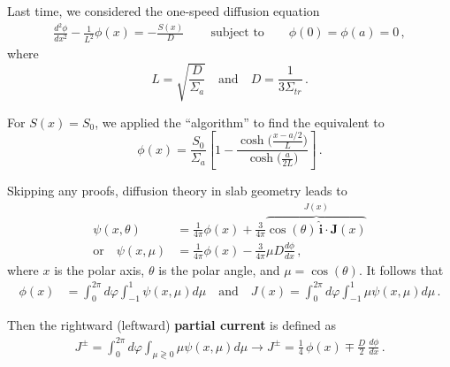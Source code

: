 \documentclass[compact]{ne630handout}
\begin{document}
\begin{handoutflow}


Last time, we considered the one-speed diffusion equation
\begin{align*}
   \frac{d^2 \phi}{d x^2}
  - \frac{1}{L^2}\phi(x)
  = -\frac{S(x)}{D} \, \qquad \text{subject to} \qquad \phi(0) = \phi(a) = 0 \, ,
\end{align*}
where
\begin{equation*}
 L = \sqrt{\frac{D}{\Sigma_a}} \quad \text{and} \quad D = \frac{1}{3\Sigma_{tr}} \, .
\end{equation*}

For $S(x) = S_0$, we applied the ``algorithm''  to find the equivalent to
\begin{equation*}
 \phi(x)=\frac{S_0}{\Sigma_a}\left[1-\frac{\cosh\!\big(\tfrac{x-a/2}{L}\big)}{\cosh\!\big(\tfrac{a}{2L}\big)}\right] \, .
 \label{eq:ex1sol}
\end{equation*}

Skipping any proofs, diffusion theory in slab geometry leads to
\begin{align*}
  \psi(x, \theta)  &= \frac{1}{4\pi} {\phi}(x) + \frac{3}{4\pi} \overbrace{\cos(\theta) \, \hat{\mathbf{i}} \cdot \mathbf{J}(x)}^{J(x)} \\
\text{or} \quad \psi(x, \mu)   &= \frac{1}{4\pi} \phi(x) - \frac{3}{4\pi} \mu D \frac{d\phi}{dx}   \, ,
\end{align*}
where $x$ is the polar axis, $\theta$ is the polar angle, and $\mu = \cos(\theta)$.  It follows that
\begin{align*}
  \phi(x) &= \int^{2 \pi}_0 d\varphi \int^1_{-1} \psi(x, \mu) d\mu \quad \text{and} \quad
  J(x)    = \int^{2 \pi}_0 d\varphi \int^1_{-1} \mu \psi(x, \mu)  d\mu \, .
\end{align*}

Then the rightward (leftward) {\bf partial current} is defined as
\begin{align*}
 J^{\pm} = \int^{2 \pi}_0 d\varphi \int_{\mu \gtrless 0} \mu \psi(x, \mu)  d\mu \rightarrow
   \boxed{ J^{\pm} = \frac{1}{4}\,\phi(x) \mp \frac{D}{2}\,\frac{d\phi}{dx} }\, .
\end{align*}


\end{handoutflow}
\end{document}
